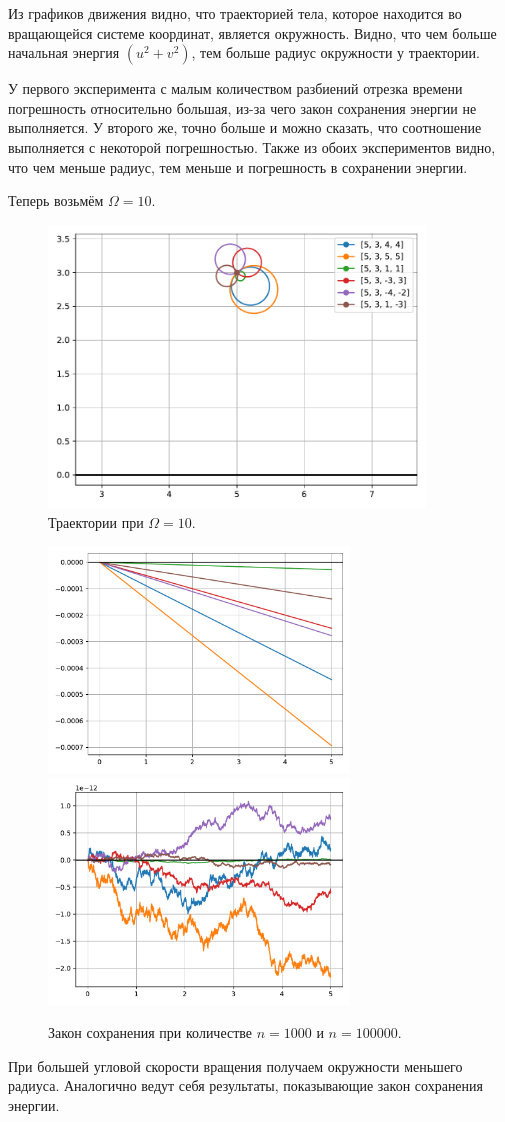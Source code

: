         Из графиков движения видно, что траекторией тела, которое находится во вращающейся системе координат, является окружность. Видно, что чем больше начальная энергия \( (u^2 + v^2) \), тем больше радиус окружности у траектории.

        У первого эксперимента с малым количеством разбиений отрезка времени погрешность относительно большая, из-за чего закон сохранения энергии не выполняется. У второго же, точно больше и можно сказать, что соотношение выполняется с некоторой погрешностью. Также из обоих экспериментов видно, что чем меньше радиус, тем меньше и погрешность в сохранении энергии.

        Теперь возьмём \( \Omega = 10 \).
        \begin{figure}[H]
            \centering
            \includegraphics[width=10cm]{pictures/n1e5plot2.pdf}
            \caption{Траектории при \( \Omega = 10 \).}
        \end{figure}

        \begin{figure}[H]
            \centering
            \includegraphics[width=8cm]{pictures/n1e3conv2.pdf}
            \includegraphics[width=8cm]{pictures/n1e5conv2.pdf}
            \caption{Закон сохранения при количестве \( n = 1000 \) и \( n = 100000 \).}
        \end{figure}

        При большей угловой скорости вращения получаем окружности меньшего радиуса. Аналогично ведут себя результаты, показывающие закон сохранения энергии.
